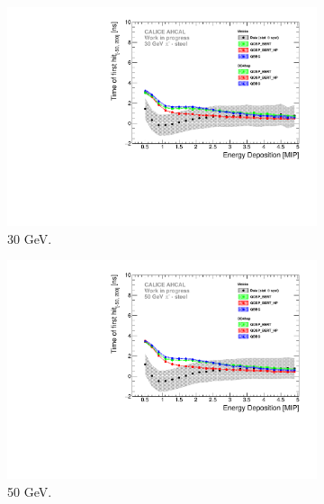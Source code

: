 \begin{figure}[htbp!]
  \begin{subfigure}[t]{0.5\textwidth}
    \centering
    \includegraphics[width=1\textwidth]{../Thesis_Plots/Timing/Pions/Plots/ComparisonToSim/Time_Energy_30GeV.pdf}
    \caption{30 GeV.}\label{fig:Energy_SimData_30GeV}
  \end{subfigure}
  \begin{subfigure}[t]{0.5\textwidth}
    \centering
    \includegraphics[width=1\textwidth]{../Thesis_Plots/Timing/Pions/Plots/ComparisonToSim/Time_Energy_50GeV.pdf}
    \caption{50 GeV.} \label{fig:Energy_SimData_50GeV}
  \end{subfigure}
  \hfill
  \begin{subfigure}[t]{0.5\textwidth}
    \centering

\end{subfigure}
\end{figure}
